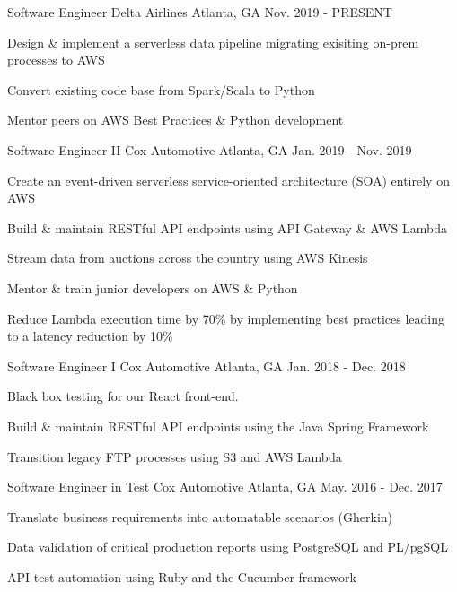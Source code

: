 
\begin{cventries}
  \cventry
    {Software Engineer} %
    {Delta Airlines} %
    {Atlanta, GA} %
    {Nov. 2019 - PRESENT} %
    {
      \begin{cvitems} %
        \item {Design \& implement a serverless data pipeline migrating exisiting on-prem processes to AWS}
        \item {Convert existing code base from Spark/Scala to Python}
        \item {Mentor peers on AWS Best Practices \& Python development}
      \end{cvitems}
    }

  \cventry
    {Software Engineer II} %
    {Cox Automotive} %
    {Atlanta, GA} %
    {Jan. 2019 - Nov. 2019} %
    {
      \begin{cvitems} %
        \item {Create an event-driven serverless service-oriented architecture (SOA) entirely on AWS}
        \item {Build \& maintain RESTful API endpoints using API Gateway \& AWS Lambda}
        \item {Stream data from auctions across the country using AWS Kinesis}
        \item {Mentor \& train junior developers on AWS \& Python}
        \item {Reduce Lambda execution time by 70\% by implementing best practices leading to a latency reduction by 10\%}
      \end{cvitems}
    }

  \cventry
    {Software Engineer I} %
    {Cox Automotive} %
    {Atlanta, GA} %
    {Jan. 2018 - Dec. 2018} %
    {
      \begin{cvitems} %
        \item {Black box testing for our React front-end.}
        \item {Build \& maintain RESTful API endpoints using the Java Spring Framework}
        \item {Transition legacy FTP processes using S3 and AWS Lambda}
      \end{cvitems}
    }
    
  \cventry
    {Software Engineer in Test} %
    {Cox Automotive} %
    {Atlanta, GA} %
    {May. 2016 - Dec. 2017} %
    {
      \begin{cvitems} %
        \item {Translate business requirements into automatable scenarios (Gherkin)}
        \item {Data validation of critical production reports using PostgreSQL and PL/pgSQL}
        \item {API test automation using Ruby and the Cucumber framework}
      \end{cvitems}
    }
\end{cventries}
